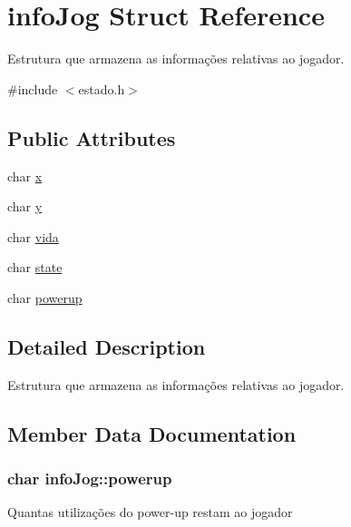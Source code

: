 \hypertarget{structinfoJog}{}\section{info\+Jog Struct Reference}
\label{structinfoJog}


Estrutura que armazena as informações relativas ao jogador.  




{\ttfamily \#include $<$estado.\+h$>$}

\subsection*{Public Attributes}
\begin{DoxyCompactItemize}
\item 
char \hyperlink{structinfoJog_a72412e2bd8636bf9bdec37137527b85f}{x}
\item 
char \hyperlink{structinfoJog_a69479b69cebd2c57ae8c2420804cb74b}{y}
\item 
char \hyperlink{structinfoJog_a69524d88bda21e0f2fbcff89a7aa9e9a}{vida}
\item 
char \hyperlink{structinfoJog_af55fd5b92e7b59ab6fc3f1151d37b187}{state}
\item 
char \hyperlink{structinfoJog_ac572f918289e409cdc17ea87834ecc67}{powerup}
\end{DoxyCompactItemize}


\subsection{Detailed Description}
Estrutura que armazena as informações relativas ao jogador. 

\subsection{Member Data Documentation}
\subsubsection[{\texorpdfstring{powerup}{powerup}}]{\setlength{\rightskip}{0pt plus 5cm}char info\+Jog\+::powerup}\hypertarget{structinfoJog_ac572f918289e409cdc17ea87834ecc67}{}\label{structinfoJog_ac572f918289e409cdc17ea87834ecc67}
Quantas utilizações do power-\/up restam ao jogador 
